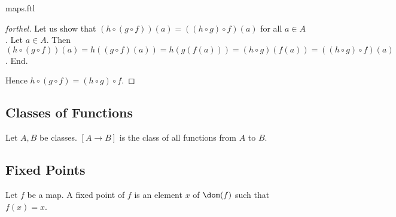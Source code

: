 \documentclass{naproche-library}
\begin{document}
\begin{smodule}{maps.ftl}
\begin{proof}[forthel]
    Let us show that $(h \circ (g \circ f))(a) = ((h \circ g) \circ f)(a)$ for all $a \in A$.
      Let $a \in A$.
      Then $(h \circ (g \circ f))(a)
        = h((g \circ f)(a))
        = h(g(f(a)))
        = (h \circ g)(f(a))
        = ((h \circ g) \circ f)(a)$.
    End.

    Hence $h \circ (g \circ f) = (h \circ g) \circ f$.
  \end{proof}


  \subsection*{Classes of Functions}

  \begin{definition}[forthel,id=FOUNDATIONS_06_5119110467813376]
    Let $A, B$ be classes.
    $[A \to B]$ is the class of all functions from $A$ to $B$.
  \end{definition}


  \subsection*{Fixed Points}

  \begin{definition}[forthel,id=FOUNDATIONS_06_2177076576649216]
    Let $f$ be a map.
    A fixed point of $f$ is an element $x$ of $\dom(f)$ such that $f(x) = x$.
  \end{definition}
\end{smodule}
\end{document}
